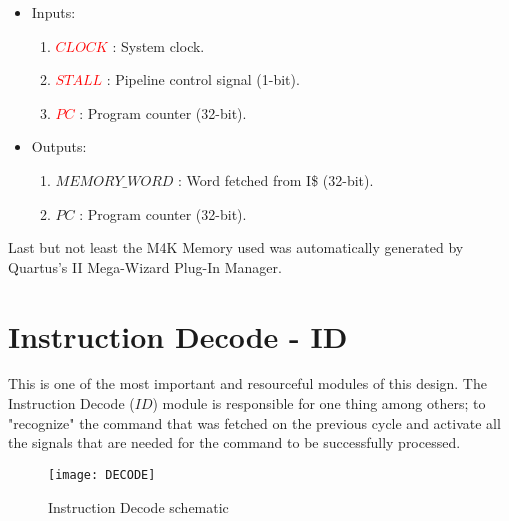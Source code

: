 	 {\small
 	 \renewcommand{\labelenumii}{\Roman{enumii}}
	 \begin{itemize}
	 	\item Inputs:
	 	\begin{enumerate}
	 		
	 		\item \textcolor{red}{$CLOCK$} : System clock.
	 		\item \textcolor{red}{$STALL$} : Pipeline control signal (1-bit).
	 		\item \textcolor{red}{$PC$}    : Program counter (32-bit).
	 	\end{enumerate}
 		\item Outputs:
 		\begin{enumerate}
 		
 			\item \textcolor{forestgreen(web)}{$MEMORY\_WORD$} : Word fetched from I\$ (32-bit).
 			\item \textcolor{forestgreen(web)}{$PC$}	 	   : Program counter (32-bit).
 		\end{enumerate}
	 \end{itemize}}
 	\vspace{5mm}
 	 	
 	Last but not least the M4K Memory used was automatically generated by Quartus's II Mega-Wizard Plug-In Manager.
 	
 	\newpage
 	
 	\section{Instruction Decode - ID}
 	\label{Instruction Decode}
 	This is one of the most important and resourceful modules of this design. The Instruction Decode ($ID$) module is responsible for one thing among others; to "recognize" the command that was fetched on the previous cycle and activate all the signals that are needed for the command to be successfully processed.
 	
 		 \begin{figure}[h!]
 		\begin{center}
 			\texttt{[image: DECODE]}
 			\caption{Instruction Decode schematic}
 			\label{Image3.2}
 		\end{center}
 	\end{figure}
 	
 	\vspace{2mm}
 	
